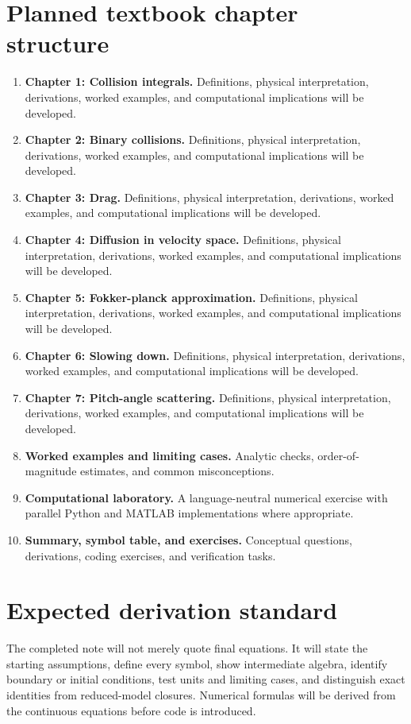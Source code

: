 \documentclass[11pt]{article}
\begin{document}
\section{Planned textbook chapter structure}
\begin{enumerate}[leftmargin=1.8em]
\item \textbf{Chapter 1: Collision integrals.} Definitions, physical interpretation, derivations, worked examples, and computational implications will be developed.
\item \textbf{Chapter 2: Binary collisions.} Definitions, physical interpretation, derivations, worked examples, and computational implications will be developed.
\item \textbf{Chapter 3: Drag.} Definitions, physical interpretation, derivations, worked examples, and computational implications will be developed.
\item \textbf{Chapter 4: Diffusion in velocity space.} Definitions, physical interpretation, derivations, worked examples, and computational implications will be developed.
\item \textbf{Chapter 5: Fokker-planck approximation.} Definitions, physical interpretation, derivations, worked examples, and computational implications will be developed.
\item \textbf{Chapter 6: Slowing down.} Definitions, physical interpretation, derivations, worked examples, and computational implications will be developed.
\item \textbf{Chapter 7: Pitch-angle scattering.} Definitions, physical interpretation, derivations, worked examples, and computational implications will be developed.
\item \textbf{Worked examples and limiting cases.} Analytic checks, order-of-magnitude estimates, and common misconceptions.
\item \textbf{Computational laboratory.} A language-neutral numerical exercise with parallel Python and MATLAB implementations where appropriate.
\item \textbf{Summary, symbol table, and exercises.} Conceptual questions, derivations, coding exercises, and verification tasks.
\end{enumerate}

\section{Expected derivation standard}
The completed note will not merely quote final equations. It will state the starting assumptions, define every symbol, show intermediate algebra, identify boundary or initial conditions, test units and limiting cases, and distinguish exact identities from reduced-model closures. Numerical formulas will be derived from the continuous equations before code is introduced.
\end{document}
